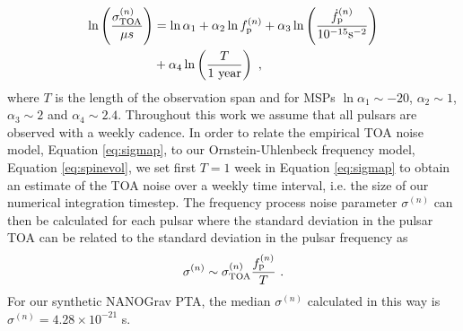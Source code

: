 \documentclass[fleqn,usenatbib,useAMS]{mnras}
\begin{document}
\begin{align}
	\ln \left(\frac{\sigma_{\rm TOA}^{(n)}}{\mu s} \right)&= \ln \alpha_1 +  \alpha_2 \ln f_{\rm p}^{(n)} + \alpha_3 \ln \left(\frac{\dot{f}_{\rm p}^{(n)}}{10^{-15} \text{s}^{-2}} \right) \nonumber \\ 
	&+ \alpha_4 \ln \left( \frac{T}{ 1 \text{ year}} \right) \ , \label{eq:sigmap}
\end{align}
where $T$ is the length of the observation span and for MSPs $\ln \alpha_1 \sim -20 $, $\alpha_2 \sim 1$, $\alpha_3 \sim 2$ and $\alpha_4 \sim 2.4$. Throughout this work we assume that all pulsars are observed with a weekly cadence. In order to relate the empirical TOA noise model, Equation \ref{eq:sigmap}, to our Ornstein-Uhlenbeck frequency model, Equation \ref{eq:spinevol}, we set first $T = 1$ week in Equation \ref{eq:sigmap} to obtain an estimate of the TOA noise over a weekly time interval, i.e. the size of our numerical integration timestep. The frequency process noise parameter $\sigma^{(n)}$ can then be calculated for each pulsar where the standard deviation in the pulsar TOA can be related to the standard deviation in the pulsar frequency as 
\begin{eqnarray}
	\sigma^{(n)} \sim \sigma_{\rm TOA}^{(n)} \frac{f_{\rm p}^{(n)}}{T} \ . \label{eq:sigmap_f}
\end{eqnarray}
For our synthetic NANOGrav PTA, the median $\sigma^{(n)}$ calculated in this way is $\sigma^{(n)} = 4.28 \times 10^{-21} $ s. \newline 
\end{document}
